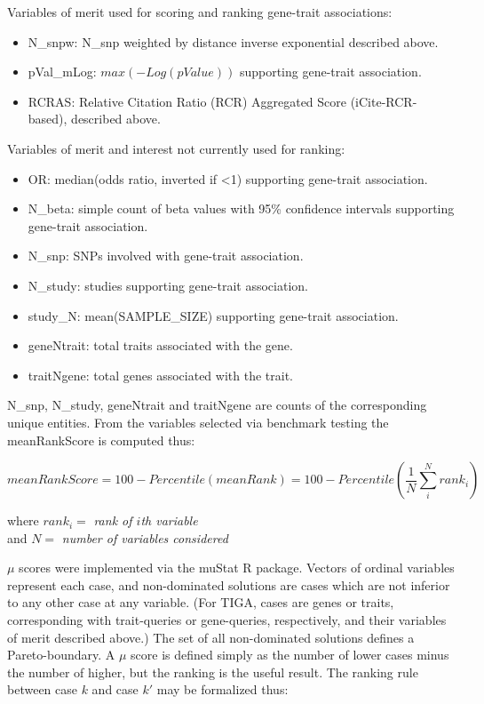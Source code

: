 Variables of merit used for scoring and ranking gene-trait associations:

\begin{itemize}
\item N\_snpw: N\_snp weighted by distance inverse exponential described above.
\item pVal\_mLog: $max(-Log(pValue))$ supporting gene-trait association.
\item RCRAS: Relative Citation Ratio (RCR) Aggregated Score (iCite-RCR-based), described above.
\end{itemize}

Variables of merit and interest not currently used for ranking:

\begin{itemize}
\item OR: median(odds ratio, inverted if <1) supporting gene-trait association.
\item N\_beta: simple count of beta values with 95\% confidence intervals supporting gene-trait association.
\item N\_snp: SNPs involved with gene-trait association.
\item N\_study: studies supporting gene-trait association.
\item study\_N: mean(SAMPLE\_SIZE) supporting gene-trait association.
\item geneNtrait: total traits associated with the gene.
\item traitNgene: total genes associated with the trait.
\end{itemize}

N\_snp, N\_study, geneNtrait and traitNgene are counts of the corresponding unique entities. From the variables selected via benchmark testing the meanRankScore is computed thus:

\begin{equation}
    meanRankScore = 100 - Percentile(meanRank) = 100 - Percentile(\frac{1}{N} \sum_{i}^{N} rank_{i})
\end{equation}

\begin{center}
    where $ rank_{i} = $ \emph{rank of $ i $th variable} \\
    and $ N = $ \emph{number of variables considered}
\end{center}

$\mu$ scores were implemented via the muStat\cite{Wittkowski2012-fk} R package. Vectors of ordinal variables represent each case, and non-dominated solutions are cases which are not inferior to any other case at any variable. (For TIGA, cases are genes or traits, corresponding with trait-queries or gene-queries, respectively, and their variables of merit described above.) The set of all non-dominated solutions defines a Pareto-boundary. A $\mu$ score is defined simply as the number of lower cases minus the number of higher, but the ranking is the useful result. The ranking rule between case $k$ and case $k'$ may be formalized thus:

